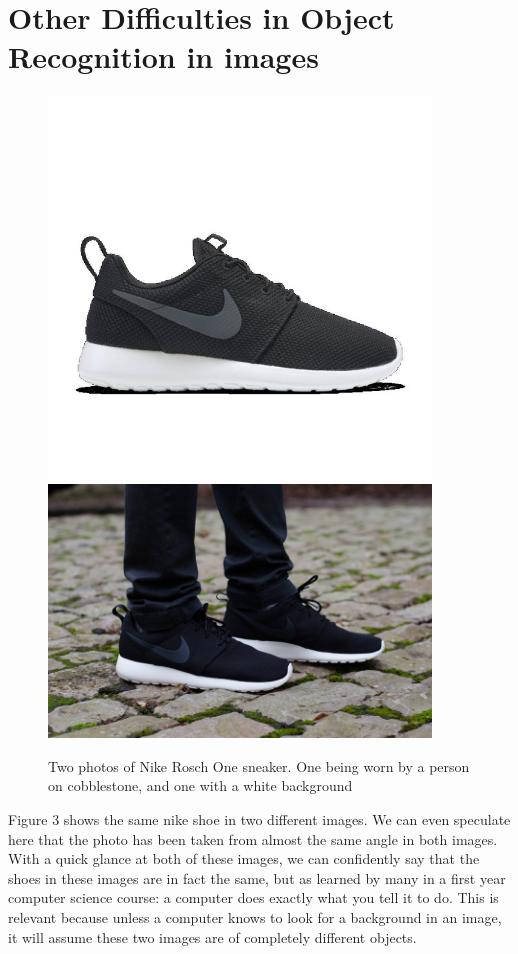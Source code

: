 \documentclass[12pt]{report} %
\begin{document}
\section{Other Difficulties in Object Recognition in images}
\begin{figure}
\centering
\includegraphics[width=4in]{nike} 
\centering
\includegraphics[width=4in]{nike_on_man} 
\caption{Two photos of Nike Rosch One sneaker. One being worn by a person on cobblestone, and one with a white background}
\end{figure}
	
	Figure 3 shows the same nike shoe in two different images. We can even speculate here that the photo has been taken from almost the same angle in both images. With a quick glance at both of these images, we can confidently say that the shoes in these images are in fact the same, but as learned by many in a first year computer science course: a computer does exactly what you tell it to do. This is relevant because unless a computer knows to look for a background in an image, it will assume these two images are of completely different objects. 
\end{document}
